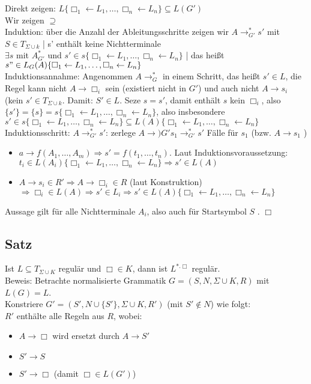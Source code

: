 \documentclass[titlepage]{article}
\begin{document}
Direkt zeigen: $L\{ \Box_1 \leftarrow L_1, \dots, \Box_n \leftarrow L_n \} \subseteq L(G')$\\
Wir zeigen \glqq $\supseteq$ \grqq\\
Induktion: \"uber die Anzahl der Ableitungsschritte zeigen wir
$A \to_{G'}^\ast s'$ mit $S \in T_{\Sigma \cup k}$ | s' enth\"alt keine Nichtterminale\\
$\exists s$ mit $A_{G'}^\ast$ und $s' \in s\{ \Box_1 \leftarrow L_1, \dots, \Box_n \leftarrow L_n \}$ |
das hei\ss t $s" \in L_G(A)\{ \Box_1 \leftarrow L_1, \dots, \Box_n \leftarrow L_n \}$\\

Induktionsannahme: Angenommen $A \to_G^\ast$ in einem Schritt, das hei\ss t $s' \in L$, die Regel
kann nicht $A \to \Box_i$ sein (existiert nicht in $G'$) und auch nicht $A \to s_i$ 
(kein $s' \in T_{\Sigma \cup k}$. Damit: $S' \in L$. Seze $s = s'$, damit enth\"alt $s$ kein $\Box_i$, also
$\{s'\} = \{s\} = s\{ \Box_1 \leftarrow L_1, \dots, \Box_n \leftarrow L_n \}$, also insbesondere
$s' \in s\{ \Box_1 \leftarrow L_1, \dots, \Box_n \leftarrow L_n \} \subseteq 
L(A)\{ \Box_1 \leftarrow L_1, \dots, \Box_n \leftarrow L_n \}$\\
Induktionsschritt: $A \to_{G'}^\ast s'$: zerlege $A \to){G'} s_1 \to^\ast_{G'} s'$
F\"alle f\"ur $s_1$ (bzw. $A \to s_1$ )
\begin{itemize}
    \item $a \to f(A_1, \dots, A_m) \Rightarrow s' = f(t_1, \dots, t_n)$. Laut Induktionsvoraussetzung:
        $t_i \in L(A_i)\{ \Box_1 \leftarrow L_1, \dots, \Box_n \leftarrow L_n \} \Rightarrow s' \in L(A)$
    \item $A \to s_i \in R' \Rightarrow A \to \Box_i \in R$ (laut Konstruktion) 
        $\Rightarrow \Box_i \in L(A) \Rightarrow s' \in L_i \Rightarrow s' \in 
        L(A)\{ \Box_1 \leftarrow L_1, \dots, \Box_n \leftarrow L_n \}$
\end{itemize}

Aussage gilt f\"ur  alle Nichtterminale $A_i$, also auch f\"ur Startsymbol $S$ . $\Box$

\subsection{Satz}

Ist $L \subseteq T_{\Sigma \cup K}$ regul\"ar und $\Box \in K$, dann ist $L^{\ast . \Box}$ regul\"ar.\\
Beweis: Betrachte normalisierte Grammatik $G = (S, N, \Sigma \cup K, R)$ mit $L(G) = L$.\\
Konstriere $G' = (S', N \cup \{S'\}, \Sigma \cup K, R')$ (mit $S' \notin N$) wie folgt:\\
$R'$ enth\"alte alle Regeln aus $R$, wobei:
\begin{itemize}
    \item $A \to \Box$ wird ersetzt durch $A \to S'$
    \item $S' \to S$
    \item $S' \to \Box$ (damit $\Box \in L(G')$)
\end{itemize}
\end{document}
